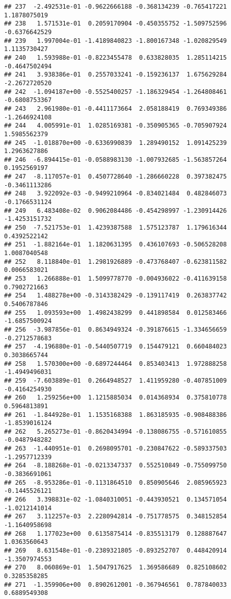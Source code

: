 \documentclass[
]{article}
\begin{document}
\begin{verbatim}
## 237  -2.492531e-01 -0.9622666188 -0.368134239 -0.765417221  1.1878075019
## 238   1.571531e-01  0.2059170904 -0.450355752 -1.509752596 -0.6376642529
## 239   1.997004e-01 -1.4189840823 -1.800167348 -1.020829549  1.1135730427
## 240   1.593988e-01 -0.8223455478  0.633828035  1.285114215 -0.4647502494
## 241   3.938386e-01  0.2557033241 -0.159236137  1.675629284 -2.2672720520
## 242  -1.094187e+00 -0.5525400257 -1.186329454 -1.264808461 -0.6808753367
## 243   2.961980e-01 -0.4411173664  2.058188419  0.769349386 -1.2646924108
## 244   4.005991e-01  1.0285169381 -0.350905365 -0.705907924  1.5985562379
## 245  -1.018870e+00 -0.6336990839  1.289490152  1.091425239  1.2963627886
## 246  -6.894415e-01 -0.0588983130 -1.007932685 -1.563857264  0.1952569197
## 247  -8.117057e-01  0.4507728640 -1.286660228  0.397382475 -0.3461113286
## 248   3.922092e-03 -0.9499210964 -0.834021484  0.482846073 -0.1766531124
## 249   6.483408e-02  0.9062084486 -0.454298997 -1.230914426 -1.4253151732
## 250  -7.521753e-01  1.4239387588  1.575123787  1.179616344  0.4392522142
## 251  -1.882164e-01  1.1820631395  0.436107693 -0.506528208  1.0087040548
## 252   8.118840e-01  1.2981926889 -0.473768407 -0.623811582  0.0066583021
## 253   1.266888e-01  1.5099778770 -0.004936022 -0.411639158  0.7902721663
## 254   1.488278e+00 -0.3143382429 -0.139117419  0.263837742  0.5406787846
## 255   1.093593e+00  1.4982438299  0.441898584  0.012583466 -1.6857500924
## 256  -3.987856e-01  0.8634949324 -0.391876615 -1.334656659 -0.2712578683
## 257  -4.196880e-01 -0.5440507719  0.154479121  0.660484023  0.3038665744
## 258   1.570300e+00 -0.6897244464  0.853403413  1.972888258 -1.4949496031
## 259  -7.603889e-01  0.2664948527  1.411959280 -0.407851009 -0.4164254930
## 260   1.259256e+00  1.1215885034  0.014368934  0.375810778  0.5964813891
## 261  -1.844928e-01  1.1535168388  1.863185935 -0.908488386 -1.8539016124
## 262   5.265273e-01 -0.8620434994 -0.138086755 -0.571610855 -0.0487948282
## 263  -1.440951e-01  0.2698095701 -0.230847622 -0.589337503 -1.2957712339
## 264  -8.188268e-01 -0.0213347337  0.552510849 -0.755099750 -0.3836691061
## 265  -8.953286e-01 -0.1131864510  0.850905646  2.085965923 -0.1445526121
## 266   3.398831e-02 -1.0840310051 -0.443930521  0.134571054 -1.0212141014
## 267   3.112257e-03  2.2280942814 -0.751778575  0.348152854 -1.1640958698
## 268   1.177023e+00  0.6135875414 -0.835513179  0.128887647  1.0363560643
## 269   8.631548e-01 -0.2389321805 -0.893252707  0.448420914 -1.3507974553
## 270   8.060869e-01  1.5047917625  1.369586689  0.825108602  0.3285358285
## 271  -1.359906e+00  0.8902612001 -0.367946561  0.787840033  0.6889549308

\end{verbatim}
\end{document}
